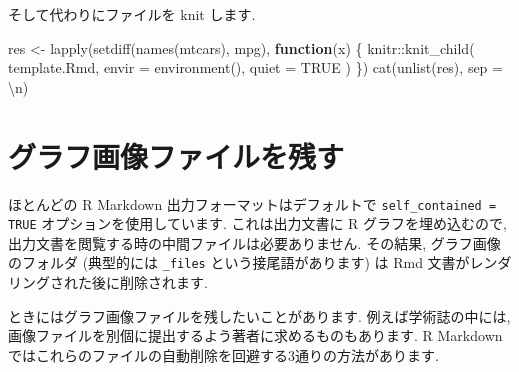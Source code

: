 \documentclass[
  11pt,
  lualatex,
  ja=standard]{bxjsreport}
\newenvironment{Shaded}{\begin{snugshade}}{\end{snugshade}}
\newcommand{\AttributeTok}[1]{\textcolor[rgb]{0.77,0.63,0.00}{#1}}
\newcommand{\ConstantTok}[1]{\textcolor[rgb]{0.00,0.00,0.00}{#1}}
\newcommand{\ControlFlowTok}[1]{\textcolor[rgb]{0.13,0.29,0.53}{\textbf{#1}}}
\newcommand{\FunctionTok}[1]{\textcolor[rgb]{0.00,0.00,0.00}{#1}}
\newcommand{\NormalTok}[1]{#1}
\newcommand{\OtherTok}[1]{\textcolor[rgb]{0.56,0.35,0.01}{#1}}
\newcommand{\SpecialCharTok}[1]{\textcolor[rgb]{0.00,0.00,0.00}{#1}}
\newcommand{\StringTok}[1]{\textcolor[rgb]{0.31,0.60,0.02}{#1}}
\begin{document}
そして代わりにファイルを knit します.

\begin{Shaded}
\begin{Highlighting}[numbers=left,,]
\NormalTok{res }\OtherTok{\textless{}{-}} \FunctionTok{lapply}\NormalTok{(}\FunctionTok{setdiff}\NormalTok{(}\FunctionTok{names}\NormalTok{(mtcars), }\StringTok{\textquotesingle{}mpg\textquotesingle{}}\NormalTok{), }\ControlFlowTok{function}\NormalTok{(x) \{}
\NormalTok{  knitr}\SpecialCharTok{::}\FunctionTok{knit\_child}\NormalTok{(}
    \StringTok{\textquotesingle{}template.Rmd\textquotesingle{}}\NormalTok{, }\AttributeTok{envir =} \FunctionTok{environment}\NormalTok{(), }\AttributeTok{quiet =} \ConstantTok{TRUE}
\NormalTok{  )}
\NormalTok{\})}
\FunctionTok{cat}\NormalTok{(}\FunctionTok{unlist}\NormalTok{(res), }\AttributeTok{sep =} \StringTok{\textquotesingle{}}\SpecialCharTok{\textbackslash{}n}\StringTok{\textquotesingle{}}\NormalTok{)}
\end{Highlighting}
\end{Shaded}

\hypertarget{keep-files}{%
\section{グラフ画像ファイルを残す}\label{keep-files}}

ほとんどの R Markdown 出力フォーマットはデフォルトで \texttt{self\_contained = TRUE} オプションを使用しています. これは出力文書に R グラフを埋め込むので, 出力文書を閲覧する時の中間ファイルは必要ありません. その結果, グラフ画像のフォルダ (典型的には \texttt{\_files} という接尾語があります) は Rmd 文書がレンダリングされた後に削除されます.

ときにはグラフ画像ファイルを残したいことがあります. 例えば学術誌の中には, 画像ファイルを別個に提出するよう著者に求めるものもあります. R Markdown ではこれらのファイルの自動削除を回避する3通りの方法があります.
\end{document}
